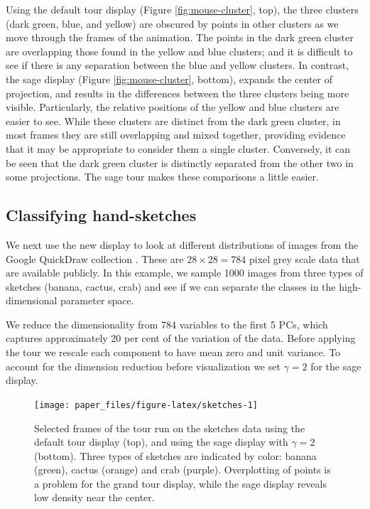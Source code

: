 \documentclass[]{interact}
\theoremstyle{plain}%
\theoremstyle{definition}
\theoremstyle{remark}
\begin{document}
Using the default tour display (Figure \ref{fig:mouse-cluster}, top),
the three clusters (dark green, blue, and yellow) are obscured by points
in other clusters as we move through the frames of the animation. The
points in the dark green cluster are overlapping those found in the
yellow and blue clusters; and it is difficult to see if there is any
separation between the blue and yellow clusters. In contrast, the sage
display (Figure \ref{fig:mouse-cluster}, bottom), expands the center of
projection, and results in the differences between the three clusters
being more visible. Particularly, the relative positions of the yellow
and blue clusters are easier to see. While these clusters are distinct
from the dark green cluster, in most frames they are still overlapping
and mixed together, providing evidence that it may be appropriate to
consider them a single cluster. Conversely, it can be seen that the dark
green cluster is distinctly separated from the other two in some
projections. The sage tour makes these comparisons a little easier.

\hypertarget{sec:appl2}{%
\subsection{Classifying hand-sketches}\label{sec:appl2}}

We next use the new display to look at different distributions of images
from the Google QuickDraw collection \citep{quickdraw-paper}. These are
\(28\times28=784\) pixel grey scale data that are available publicly. In
this example, we sample 1000 images from three types of sketches
(banana, cactus, crab) and see if we can separate the classes in the
high-dimensional parameter space.

We reduce the dimensionality from 784 variables to the first 5 PCs,
which captures approximately 20 per cent of the variation of the data.
Before applying the tour we rescale each component to have mean zero and
unit variance. To account for the dimension reduction before
visualization we set \(\gamma=2\) for the sage display.

\begin{figure}

{\centering \texttt{[image: paper\_files/figure-latex/sketches-1]} 

}

\caption{Selected frames  of the tour run on the sketches data using the default tour display (top), and using the sage display with $\gamma=2$ (bottom). Three types of sketches are indicated by color: banana (green), cactus (orange) and crab (purple). Overplotting of points is a problem for the grand tour display, while the sage display reveals low density near the center.}\label{fig:sketches}
\end{figure}
\end{document}
